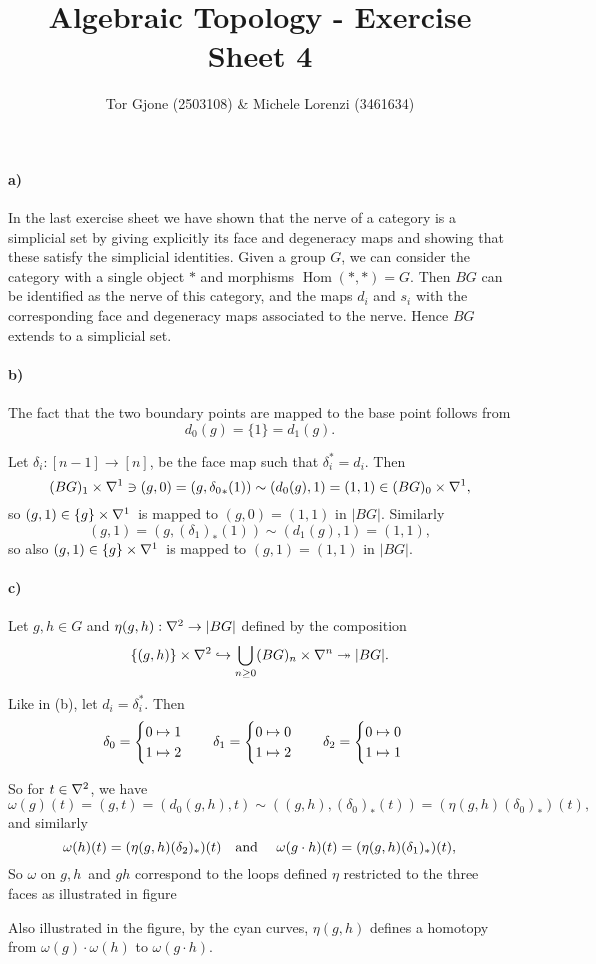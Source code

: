 \documentclass[a4paper,11pt,english]{article}
\title{\textbf{Algebraic Topology} - Exercise Sheet 4}
\author{Tor Gjone (2503108) \& Michele Lorenzi (3461634)}
\begin{document}
\mmaketitle
\begin{exercise}[1]
\paragraph{a)} In the last exercise sheet we have shown that the nerve of a category is a simplicial set by giving explicitly its face and degeneracy maps and showing that these satisfy the simplicial identities. Given a group $G$, we can consider the category with a single object $*$ and morphisms $\operatorname{Hom}(*,*)=G$. Then $BG$ can be identified as the nerve of this category, and the maps $d_i$ and $s_i$ with the corresponding face and degeneracy maps associated to the nerve. Hence $BG$ extends to a simplicial set.

\paragraph{b)} The fact that the two boundary points are mapped to the base point follows from
\[ d_0(g) = \{1\} = d_1(g). \]

Let $\delta_i: [n-1] \to [n]$, be the face map such that $\delta_i^* = d_i$.
Then
\[ (BG)_1 \times \nabla^1 \ni (g,0) = (g,{\delta_0}_*(1)) \sim (d_0(g),1) = (1,1)
\in (BG)_0\times \nabla^1, \]
so $(g,1) \in \{g\}\times \nabla^1$ is mapped to $(g,0) = (1,1)$ in $|BG|$.
Similarly
\[ (g,1) = (g,(\delta_1)_*(1)) \sim (d_1(g),1) = (1,1), \]
so also $(g,1) \in \{g\}\times \nabla^1$ is mapped to $(g,1) = (1,1)$ in $|BG|$.

\paragraph{c)} Let $g,h \in G$ and $\eta(g,h) : \nabla^2 \to |BG|$ defined by the composition
\[ \{ (g,h) \}\times \nabla^2 \hookrightarrow \bigcup_{n\ge 0} (BG)_n \times \nabla^n \twoheadrightarrow
|BG|. \]

Like in (b), let $d_i = \delta_i^*$. Then
\[
\delta_0= \begin{cases} 0\mapsto 1 \\ 1 \mapsto 2 \end{cases} \quad
\delta_1= \begin{cases} 0\mapsto 0 \\ 1 \mapsto 2 \end{cases} \quad
\delta_2= \begin{cases} 0\mapsto 0 \\ 1 \mapsto 1 \end{cases}
\]

So for $t\in \nabla^2$, we have
\[ \omega(g)(t) = (g,t) = (d_0(g,h), t) \sim
((g,h),(\delta_0)_*(t)) = (\eta(g,h) (\delta_0)_*)(t), \]
and similarly
\[ \omega(h)(t) = (\eta(g,h) (\delta_2)_*)(t) \quad\text{and }\quad
\omega(g\cdot h)(t) = (\eta(g,h) (\delta_1)_*)(t), \]
So $\omega$ on $g,h$ and $gh$ correspond to the loops defined $\eta$ restricted
to the three faces as illustrated in figure 

\begin{figure}
\caption{}
\label{fig:1}
\centering

\end{figure}

Also illustrated in the figure, by the cyan curves, $\eta(g,h)$ defines a
homotopy from $\omega(g)\cdot \omega(h)$ to $\omega(g\cdot h)$.
\end{exercise}
\end{document}
